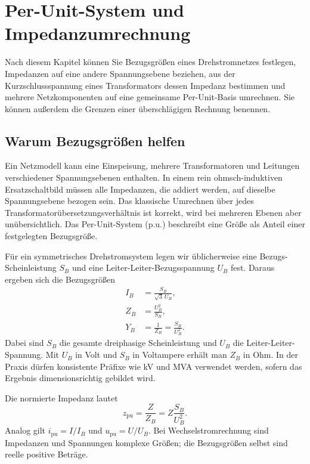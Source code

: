 \chapter{Per-Unit-System und Impedanzumrechnung}
\label{chap:perunit}

\begin{lernziel}
Nach diesem Kapitel können Sie Bezugsgrößen eines Drehstromnetzes festlegen,
Impedanzen auf eine andere Spannungsebene beziehen, aus der
Kurzschlussspannung eines Transformators dessen Impedanz bestimmen und
mehrere Netzkomponenten auf eine gemeinsame Per-Unit-Basis umrechnen. Sie
können außerdem die Grenzen einer überschlägigen Rechnung benennen.
\end{lernziel}

\section{Warum Bezugsgrößen helfen}

Ein Netzmodell kann eine Einspeisung, mehrere Transformatoren und Leitungen
verschiedener Spannungsebenen enthalten. In einem rein ohmsch-induktiven
Ersatzschaltbild müssen alle Impedanzen, die addiert werden, auf dieselbe
Spannungsebene bezogen sein. Das klassische Umrechnen über jedes
Transformatorübersetzungsverhältnis ist korrekt, wird bei mehreren Ebenen aber
unübersichtlich. Das Per-Unit-System (p.u.) beschreibt eine Größe als Anteil
einer festgelegten Bezugsgröße.

Für ein symmetrisches Drehstromsystem legen wir üblicherweise eine
Bezugs-Scheinleistung $S_B$ und eine Leiter-Leiter-Bezugsspannung $U_B$ fest.
Daraus ergeben sich die Bezugsgrößen
\begin{align}
  I_B &= \frac{S_B}{\sqrt{3}\,U_B},\\
  Z_B &= \frac{U_B^2}{S_B},\\
  Y_B &= \frac{1}{Z_B}=\frac{S_B}{U_B^2}.
\end{align}
Dabei sind $S_B$ die gesamte dreiphasige Scheinleistung und $U_B$ die
Leiter-Leiter-Spannung. Mit $U_B$ in Volt und $S_B$ in Voltampere erhält man
$Z_B$ in Ohm. In der Praxis dürfen konsistente Präfixe wie kV und MVA
verwendet werden, sofern das Ergebnis dimensionsrichtig gebildet wird.

Die normierte Impedanz lautet
\begin{equation}
  z_{\mathrm{pu}}=\frac{Z}{Z_B}=Z\frac{S_B}{U_B^2}.
  \label{eq:zpu}
\end{equation}
Analog gilt $i_{\mathrm{pu}}=I/I_B$ und $u_{\mathrm{pu}}=U/U_B$.
Bei Wechselstromrechnung sind Impedanzen und Spannungen komplexe Größen; die
Bezugsgrößen selbst sind reelle positive Beträge.

